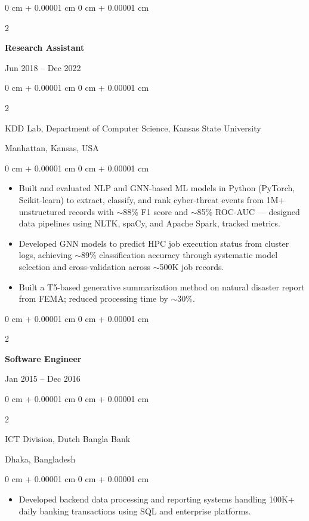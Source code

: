 \documentclass[10pt, letterpaper]{article}
\newenvironment{highlights}{
    \begin{itemize}[
        topsep=0.10 cm,
        parsep=0.10 cm,
        partopsep=0pt,
        itemsep=0pt,
        leftmargin=0 cm + 10pt
    ]
}{
    \end{itemize}
} %
\newenvironment{onecolentry}{
    \begin{adjustwidth}{
        0 cm + 0.00001 cm
    }{
        0 cm + 0.00001 cm
    }
}{
    \end{adjustwidth}
} %
\newenvironment{twocolentry}[2][]{
    \onecolentry
    \def\secondColumn{#2}
    \setcolumnwidth{\fill, 4.5 cm}
    \begin{paracol}{2}
}{
    \switchcolumn \raggedleft \secondColumn
    \end{paracol}
    \endonecolentry
} %
\begin{document}
    \vspace{1mm}

    \begin{twocolentry}{Jun 2018 -- Dec 2022}
        \textbf{Research Assistant}
    \end{twocolentry}
    \begin{twocolentry}{Manhattan, Kansas, USA}
       KDD Lab, Department of Computer Science, Kansas State University
    \end{twocolentry}
    \vspace{0.10 cm}
    \begin{onecolentry}
        \begin{highlights}
            \item Built and evaluated NLP and GNN-based ML models in Python (PyTorch, Scikit-learn) to extract, classify, and rank cyber-threat events from 1M+ unstructured records with $\sim$88\% F1 score and $\sim$85\% ROC-AUC — designed data pipelines using NLTK, spaCy, and Apache Spark, tracked metrics.
            \item Developed GNN models to predict HPC job execution status from cluster logs, achieving $\sim$89\% classification accuracy through systematic model selection and cross-validation across $\sim$500K job records.
            \item Built a T5-based generative summarization method on natural disaster report from FEMA; reduced processing time by $\sim$30\%.
        \end{highlights}
    \end{onecolentry}

    \vspace{0.1 cm}
    \begin{twocolentry}{Jan 2015 -- Dec 2016}
        \textbf{Software Engineer}
    \end{twocolentry}
    \begin{twocolentry}{Dhaka, Bangladesh}
       ICT Division, Dutch Bangla Bank
    \end{twocolentry}

    \begin{onecolentry}
        \begin{highlights}
            \item Developed backend data processing and reporting systems handling 100K+ daily banking transactions using SQL and enterprise platforms.
        \end{highlights}
    \end{onecolentry}
\end{document}
